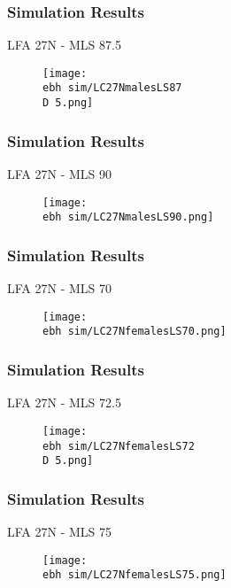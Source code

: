 \documentclass{beamer}
\newcommand{\ebh}{\string~/bio.data/bio.lobster/figures/LFA2733Framework2018/} %
\newcommand{\D}{.}
\begin{document}
\begin{frame}
\frametitle{Simulation Results}
LFA 27N - MLS 87.5
\begin{figure}
        \begin{center}
            \texttt{[image: \\ebh sim/LC27NmalesLS87\\D 5.png]}
        \end{center}
    \end{figure}
\end{frame}


\begin{frame}
\frametitle{Simulation Results}
LFA 27N - MLS 90
\begin{figure}
        \begin{center}
            \texttt{[image: \\ebh sim/LC27NmalesLS90.png]}
        \end{center}
    \end{figure}
\end{frame}




\begin{frame}
\frametitle{Simulation Results}
LFA 27N - MLS 70
\begin{figure}
        \begin{center}
            \texttt{[image: \\ebh sim/LC27NfemalesLS70.png]}
        \end{center}
    \end{figure}
\end{frame}


\begin{frame}
\frametitle{Simulation Results}
LFA 27N - MLS 72.5
\begin{figure}
        \begin{center}
            \texttt{[image: \\ebh sim/LC27NfemalesLS72\\D 5.png]}
        \end{center}
    \end{figure}
\end{frame}


\begin{frame}
\frametitle{Simulation Results}
LFA 27N - MLS 75
\begin{figure}
        \begin{center}
            \texttt{[image: \\ebh sim/LC27NfemalesLS75.png]}
        \end{center}
    \end{figure}
\end{frame}
\end{document}
